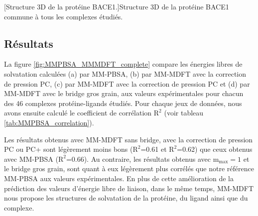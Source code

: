 \begin{center}
    \captionsetup{type=figure}
	[Structure 3D de la protéine BACE1.]{Structure 3D de la protéine BACE1 commune à tous les complexes étudiés.}
    \label{fig:structure_proteine_MMPBSA}
\end{center}









\subsection{Résultats}

La figure \ref{fig:MMPBSA_MMMDFT_complete} compare les énergies libres de solvatation calculées (a) par MM-PBSA, (b) par MM-MDFT avec la correction de pression PC, (c) par MM-MDFT avec la correction de pression PC et (d) par MM-MDFT avec le bridge gros grain, aux valeurs expérimentales pour chacun des 46 complexes protéine-ligands étudiés. Pour chaque jeux de données, nous avons ensuite calculé le coefficient de corrélation $\mathrm{R}^2$ (voir tableau \ref{tab:MMPBSA_correlation}). 



Les résultats obtenus avec MM-MDFT sans bridge, avec la correction de pression PC ou PC+ sont légèrement moins bons ($\mathrm{R}^2$=0.61 et $\mathrm{R}^2$=0.62) que ceux obtenus avec MM-PBSA ($\mathrm{R}^2$=0.66). Au contraire, les résultats obtenus avec $\mathrm{m}_\mathrm{max}=1$ et le bridge gros grain, sont quant à eux légèrement plus corrélés que notre référence MM-PBSA aux valeurs expérimentales. En plus de cette amélioration de la prédiction des valeurs d'énergie libre de liaison, dans le même temps, MM-MDFT nous propose les structures de solvatation de la protéine, du ligand ainsi que du complexe.

